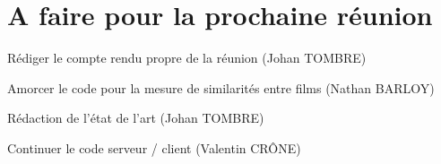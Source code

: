 \documentclass[11pt]{meetingmins}
\begin{document}
\section{A faire pour la prochaine réunion}
\begin{items}
	\item Rédiger le compte rendu propre de la réunion (Johan TOMBRE)
	\item Amorcer le code pour la mesure de similarités entre films (Nathan BARLOY)
	\item Rédaction de l'état de l'art (Johan TOMBRE)
	\item Continuer le code serveur / client (Valentin CRÔNE)
\end{items}
\vspace{1cm}
\end{document}
